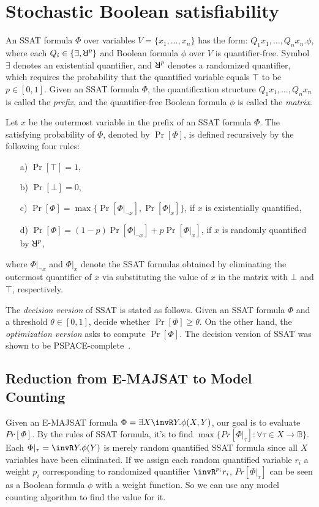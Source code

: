 \section{Stochastic Boolean satisfiability}
\label{sect:ssat}

An SSAT formula $\Phi$ over variables $V=\{x_1,\ldots,x_n\}$ has the form:
$Q_1 x_1, \ldots, Q_n x_n. \phi$, where each $Q_i \in \{\exists, \random{p}\}$ and Boolean formula $\phi$ over $V$ is quantifier-free.
Symbol $\exists$ denotes an existential quantifier, and $\random{p}$ denotes a randomized quantifier, which requires the probability that the quantified variable equals $\top$ to be $p\in[0,1]$.
Given an SSAT formula $\Phi$, the quantification structure $Q_1 x_1, \ldots, Q_n x_n$ is called the \emph{prefix},
and the quantifier-free Boolean formula $\phi$ is called the \emph{matrix}.

Let $x$ be the outermost variable in the prefix of an SSAT formula $\Phi$.
The satisfying probability of $\Phi$, denoted by $\Pr[\Phi]$, is defined recursively by the following four rules:
\begin{enumerate}
    \item[a)] $\Pr[\top]=1$,
    \item[b)] $\Pr[\bot]=0$,
    \item[c)] $\Pr[\Phi]=\max\{\Pr[\Phi|_{\neg x}], \Pr[\Phi|_{x}]\}$, if $x$ is existentially quantified,
    \item[d)] $\Pr[\Phi]=(1-p)\Pr[\Phi|_{\neg x}] + p\Pr[\Phi|_{x}]$, if $x$ is randomly quantified by $\random{p}$,
\end{enumerate}
where $\Phi|_{\neg x}$ and $\Phi|_{x}$ denote the SSAT formulas obtained by eliminating the outermost quantifier of $x$ via substituting the value of $x$ in the matrix with $\bot$ and $\top$, respectively.

The \textit{decision version} of SSAT is stated as follows.
Given an SSAT formula $\Phi$ and a threshold $\theta \in [0,1]$, decide whether $\Pr[\Phi]\geq \theta$.
On the other hand, the \textit{optimization version} asks to compute $\Pr[\Phi]$.
The decision version of SSAT was shown to be PSPACE-complete~\cite{Papadimitriou1985}.

\iffalse
    \subsection{Reduction from E-MAJSAT to Model Counting}
    Given an E-MAJSAT formula $\Phi=\exists X \invR Y. \phi(X,Y)$, our goal is to evaluate $Pr[\Phi]$. By the rules of SSAT formula, it's to find $\max\{Pr[\Phi|_{\tau}]:\forall \tau \in X \rightarrow \mathbb{B}\}$. Each $\Phi|_{\tau} = \invR Y.\phi (Y)$ is merely random quantified SSAT formula since all $X$ variables have been eliminated. If we assign each random quantified variable $r_i$ a weight $p_i$ corresponding to randomized quantifier $\invR^{p_i} r_i$, $Pr[\Phi|_{\tau}]$ can be seen as a Boolean formula $\phi$ with a weight function. So we can use any model counting algorithm to find the value for it.

